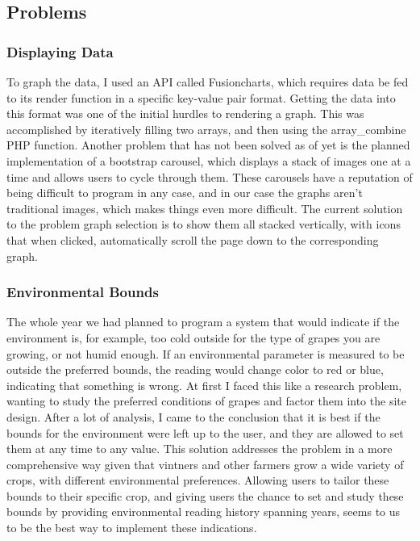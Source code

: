 \documentclass[IEEEtran,letterpaper,10pt,titlepage,fleqn,draftclsnofoot,onecolumn]{article}
\begin{document}
\subsection{Problems}

\subsubsection{Displaying Data}

To graph the data, I used an API called Fusioncharts, which requires data be fed to its render function in a specific key-value pair format. Getting the data into this format was one of the initial hurdles to rendering a graph. This was accomplished by iteratively filling two arrays, and then using the array\_combine PHP function. Another problem that has not been solved as of yet is the planned implementation of a bootstrap carousel, which displays a stack of images one at a time and allows users to cycle through them. These carousels have a reputation of being difficult to program in any case, and in our case the graphs aren't traditional images, which makes things even more difficult. The current solution to the problem graph selection is to show them all stacked vertically, with icons that when clicked, automatically scroll the page down to the corresponding graph. 

\subsubsection{Environmental Bounds}

The whole year we had planned to program a system that would indicate if the environment is, for example, too cold outside for the type of grapes you are growing, or not humid enough. If an environmental parameter is measured to be outside the preferred bounds, the reading would change color to red or blue, indicating that something is wrong. At first I faced this like a research problem, wanting to study the preferred conditions of grapes and factor them into the site design.  After a lot of analysis, I came to the conclusion that it is best if the bounds for the environment were left up to the user, and they are allowed to set them at any time to any value. This solution addresses the problem in a more comprehensive way given that vintners and other farmers grow a wide variety of crops, with different environmental preferences. Allowing users to tailor these bounds to their specific crop, and giving users the chance to set and study these bounds by providing environmental reading history spanning years, seems to us to be the best way to implement these indications. 
\end{document}
